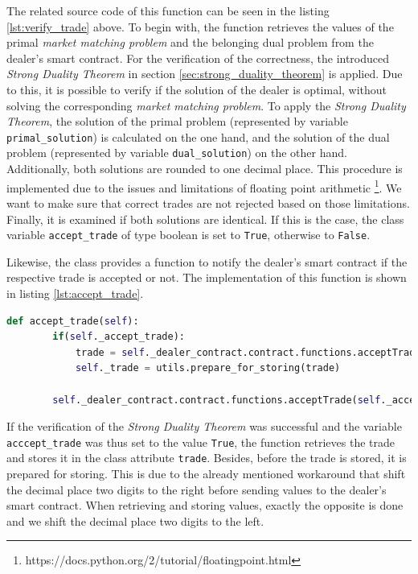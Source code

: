 The related source code of this function can be seen in the listing \ref{lst:verify_trade} above. 
To begin with, the function retrieves the values of the primal \textit{market matching problem} and
the belonging dual problem from the dealer's smart contract. For the verification of the correctness, the introduced \textit{Strong Duality Theorem}
in section \ref{sec:strong_duality_theorem} is applied. 
Due to this, it is possible to verify if the solution of the dealer is optimal, without solving the corresponding
\textit{market matching problem}.
To apply the \textit{Strong Duality Theorem}, the solution of the primal problem (represented by variable \verb|primal_solution|) is calculated
on the one hand, and the solution of the dual problem (represented by variable \verb|dual_solution|) on the other hand.
Additionally, both solutions are rounded to one decimal place. This procedure is implemented due to the issues and limitations of 
floating point arithmetic \footnote{https://docs.python.org/2/tutorial/floatingpoint.html}. 
We want to make sure that correct trades are not rejected based on those limitations.
Finally, it is examined if both solutions are identical. If this is the case, the class variable \verb|accept_trade| of type boolean is
set to \verb|True|, otherwise to \verb|False|.

Likewise, the class provides a function to notify the dealer's smart contract if the respective trade is accepted or not.
The implementation of this function is shown in listing \ref{lst:accept_trade}.

\begin{lstlisting}[float=htbp, label=lst:accept_trade, caption=Notification of trade acceptance, language=Python]
    def accept_trade(self):
        if(self._accept_trade):
            trade = self._dealer_contract.contract.functions.acceptTrade(self._accept_trade).call({'from': self._account_address})
            self._trade = utils.prepare_for_storing(trade)

        self._dealer_contract.contract.functions.acceptTrade(self._accept_trade).transact({'from': self._account_address})

\end{lstlisting}

If the verification of the \textit{Strong Duality Theorem} was successful and the variable \verb|acccept_trade| was thus set to the value \verb|True|,
the function retrieves the trade and stores it in the class attribute \verb|trade|. Besides, before the trade is stored, it is 
prepared for storing. This is due to the already mentioned workaround that shift the decimal place two digits to the right before 
sending values to the dealer's smart contract. When retrieving and storing values, exactly the opposite is done and we shift the decimal place 
two digits to the left. 

